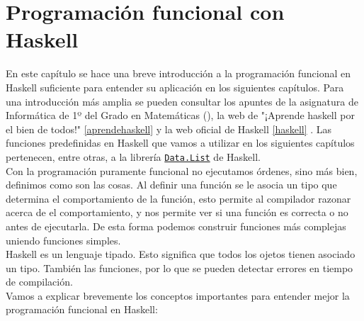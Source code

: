 \chapter{Programación funcional con Haskell}\label{sec:progfunHas}

En este capítulo se hace una breve introducción a la programación funcional en
Haskell suficiente para entender su aplicación en los siguientes
capítulos. Para una introducción más amplia se pueden consultar los apuntes de
la asignatura de Informática de 1º del Grado en Matemáticas
(\cite{Alonso-15b}), la web de "¡Aprende haskell por el bien de todos!" \ref{aprendehaskell} y la web oficial de Haskell \ref{haskell} . Las funciones predefinidas en Haskell que vamos a utilizar en los siguientes capítulos pertenecen, entre otras, a la librería \href{http://hackage.haskell.org/package/base-4.11.1.0/docs/Data-List.html}{\texttt{Data.List}} de Haskell.\\

Con la programación puramente funcional no ejecutamos órdenes, sino más bien, definimos como son las cosas. Al definir una función se le asocia un tipo que determina el comportamiento de la función, esto permite al compilador razonar acerca de el comportamiento, y nos permite ver si una función es correcta o no antes de ejecutarla. De esta forma podemos construir funciones más complejas uniendo funciones simples.\\

Haskell es un lenguaje tipado. Esto significa que todos los ojetos tienen asociado un tipo. También las funciones, por lo que se pueden detectar errores en tiempo de compilación.\\

Vamos a explicar brevemente los conceptos importantes para entender mejor la programación funcional en Haskell:


